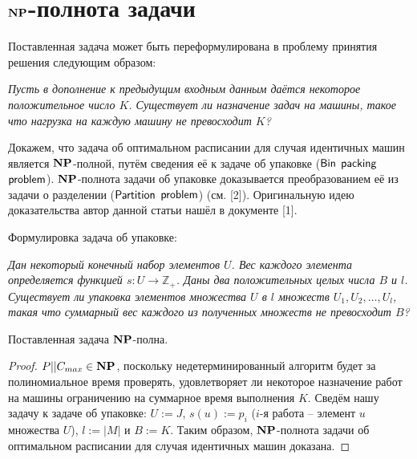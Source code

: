 \newpage
\section{$\bf{NP}$-полнота задачи}

Поставленная задача может быть переформулирована в проблему принятия решения следующим образом:

\textit{Пусть в дополнение к предыдущим входным данным даётся некоторое положительное число $K$. Существует ли назначение задач на машины, такое что нагрузка на каждую машину не превосходит $K$?}

Докажем, что задача об оптимальном расписании для случая идентичных машин является $\bf{NP}$-полной, путём сведения её к задаче об упаковке ($\sf{Bin}$ $\sf{packing}$ $\sf{problem}$). $\bf{NP}$-полнота задачи об упаковке доказывается преобразованием её из задачи о разделении ($\sf{Partition}$ $\sf{problem}$) (см. [2]). Оригинальную идею доказательства автор данной статьи нашёл в документе [1].

Формулировка задача об упаковке:

\textit{Дан некоторый конечный набор элементов $U$. Вес каждого элемента определяется функцией $s: U \rightarrow \mathbb{Z}_{+}$. Даны два положительных целых числа $B$ и $l$. Существует ли упаковка элементов множества $U$ в $l$ множеств $U_{1}, U_{2}, \ldots, U_{l}$, такая что суммарный вес каждого из полученных множеств не превосходит $B$?}

\begin{theorem}
    Поставленная задача $\bf{NP}$-полна.
\end{theorem}

\begin{proof}
    $P||C_{max} \in \bf{NP}$, поскольку недетерминированный алгоритм будет за полиномиальное время проверять, удовлетворяет ли некоторое назначение работ на машины ограничению на суммарное время выполнения $K$. Сведём нашу задачу к задаче об упаковке: $U := J$, $s(u) := p_{i}$ ($i$-я работа -- элемент $u$ множества $U$), $l := |M|$ и $B := K$. Таким образом, $\bf{NP}$-полнота задачи об оптимальном расписании для случая идентичных машин доказана.
\end{proof}